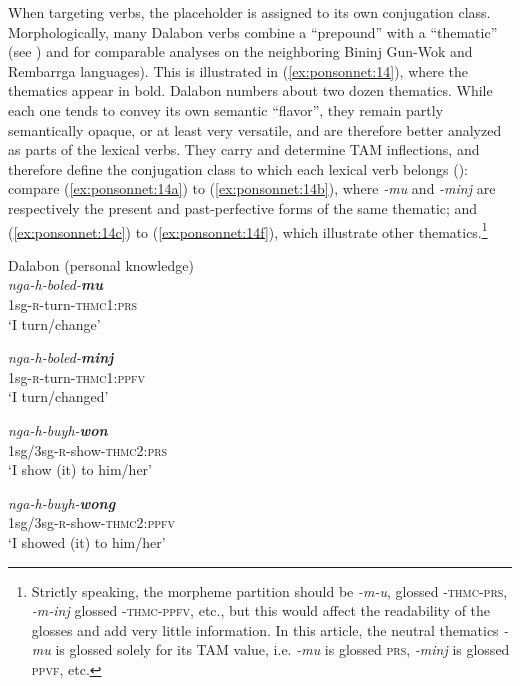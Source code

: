 \documentclass[output=paper]{langscibook}
\begin{document}
When targeting verbs, the placeholder is assigned to its own conjugation class. Morphologically, many Dalabon verbs combine a “prepound” with a “thematic” (see \citealt[chap. 8]{Evans2003bininjgunwok}) and \citet{Saulwick2003} for comparable analyses on the neighboring Bininj Gun-Wok and Rembarrga languages). This is illustrated in (\ref{ex:ponsonnet:14}), where the thematics appear in bold. Dalabon numbers about two dozen thematics. While each one tends to convey its own semantic “flavor”, they remain partly semantically opaque, or at least very versatile, and are therefore better analyzed as parts of the lexical verbs. They carry and determine TAM inflections, and therefore define the conjugation class to which each lexical verb belongs (\citealt{evans2003dalabon}): compare (\ref{ex:ponsonnet:14a}) to (\ref{ex:ponsonnet:14b}), where \textit{{}-mu} and \textit{{}-minj} are respectively the present and past-perfective forms of the same thematic; and (\ref{ex:ponsonnet:14c}) to (\ref{ex:ponsonnet:14f}), which illustrate other thematics.\footnote{Strictly speaking, the morpheme partition should be \textit{{}-m-u}, glossed -\textsc{thmc-prs}, \textit{{}-m-inj} glossed -\textsc{thmc-ppfv}, etc., but this would affect the readability of the glosses and add very little information. In this article, the neutral thematics \textit{{}-mu} is glossed solely for its TAM value, i.e. \textit{{}-mu} is glossed \textsc{prs}, \textit{{}-minj} is glossed \textsc{ppvf}, etc.}

\ea
{\label{ex:ponsonnet:14}Dalabon (personal knowledge)}\\
\ea \label{ex:ponsonnet:14a}
\gll \textit{nga-h-boled-}\textbf{\textit{mu}}\\
1sg-\textsc{r}{}-turn-\textsc{thmc1:\textsc{prs}}\\
\glt ‘I turn/change’


\ex \label{ex:ponsonnet:14b}
\gll \textit{nga-h-boled-}\textbf{\textit{minj}}\\
1sg-\textsc{r}{}-turn-\textsc{thmc1}:\textsc{ppfv}\\
\glt ‘I turn/changed’


\ex \label{ex:ponsonnet:14c}
\gll \textit{nga-h-buyh-}\textbf{\textit{won}}\\
1sg/3sg-\textsc{r}{}-show-\textsc{thmc2}:\textsc{prs} \\
\glt ‘I show (it) to him/her’

\ex \label{ex:ponsonnet:14d}
\textit{nga-h-buyh-}\textbf{\textit{wong}}\\
1sg/3sg-\textsc{r}{}-show-\textsc{thmc2}:\textsc{ppfv}\\
\glt ‘I showed (it) to him/her’\\
\end{document}
